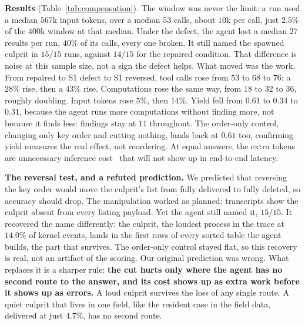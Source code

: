 \documentclass[10pt,conference]{IEEEtran}
\begin{document}
\textbf{Results} (Table~\ref{tab:compensation}). The window was never the
limit: a run used a median $567$k input tokens, over a median $53$
calls, about $10$k per call, just $2.5\%$ of the $400$k window at that
median. Under the defect, the agent lost a median $27$ results per run,
$40\%$ of its calls, every one broken. It still
named the spawned culprit in $15/15$ runs, against $14/15$ for the
repaired condition. That difference is noise at this sample size, not a
sign the defect helps. What moved was the work. From repaired to S1
defect to S1 reversed, tool calls rose from $53$ to $68$ to $76$: a
$28\%$ rise, then a $43\%$ rise. Computations rose the same way, from
$18$ to $32$ to $36$, roughly doubling. Input tokens rose $5\%$, then
$14\%$. Yield fell from $0.61$ to $0.34$ to $0.31$, because the agent
runs more computations without finding more, not because it finds less:
findings stay at $11$ throughout. The order-only control, changing only
key order and cutting nothing, lands back at $0.61$ too, confirming
yield measures the real effect, not reordering. At
equal answers, the extra tokens are unnecessary inference cost~\cite{kapoor2025agents} that
will not show up in end-to-end latency.

\textbf{The reversal test, and a refuted prediction.} We predicted that
reversing the key order would move the culprit's list from fully
delivered to fully deleted, so accuracy should drop. The manipulation
worked as planned: transcripts show the culprit absent from every
listing payload. Yet the agent still named it, $15/15$. It recovered the
name differently: the culprit, the loudest process in the trace at
$14.0\%$ of kernel events, lands in the first rows of every sorted table
the agent builds, the part that survives. The order-only control stayed flat,
so this recovery is real, not an artifact of the scoring. Our original
prediction was wrong. What replaces it is a sharper rule: \textbf{the cut
hurts only where the agent has no second route to the answer, and its
cost shows up as extra work before it shows up as errors.} A loud culprit
survives the loss of any single route. A quiet culprit that lives in one
field, like the resident case in the field data, delivered at just
$4.7\%$, has no second route.
\end{document}
